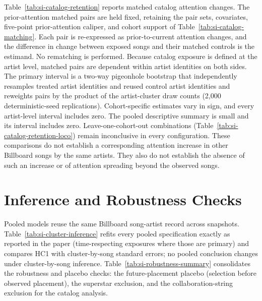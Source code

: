\documentclass[11pt]{article}
\begin{document}






Table~\ref{tab:si-catalog-retention} reports matched catalog attention changes. The prior-attention matched pairs are held fixed, retaining the pair sets, covariates, five-point prior-attention caliper, and cohort support of Table~\ref{tab:si-catalog-matching}. Each pair is re-expressed as prior-to-current attention changes, and the difference in change between exposed songs and their matched controls is the estimand. No rematching is performed. Because catalog exposure is defined at the artist level, matched pairs are dependent within artist identities on both sides. The primary interval is a two-way pigeonhole bootstrap that independently resamples treated artist identities and reused control artist identities and reweights pairs by the product of the artist-cluster draw counts (2,000 deterministic-seed replications). Cohort-specific estimates vary in sign, and every artist-level interval includes zero. The pooled descriptive summary is small and its interval includes zero. Leave-one-cohort-out combinations (Table~\ref{tab:si-catalog-retention-loco}) remain inconclusive in every configuration. These comparisons do not establish a corresponding attention increase in other Billboard songs by the same artists. They also do not establish the absence of such an increase or of attention spreading beyond the observed songs.





\section*{Inference and Robustness Checks}

Pooled models reuse the same Billboard song-artist record across snapshots. Table~\ref{tab:si-cluster-inference} refits every pooled specification exactly as reported in the paper (time-respecting exposures where those are primary) and compares HC1 with cluster-by-song standard errors; no pooled conclusion changes under cluster-by-song inference. Table~\ref{tab:si-robustness-summary} consolidates the robustness and placebo checks: the future-placement placebo (selection before observed placement), the superstar exclusion, and the collaboration-string exclusion for the catalog analysis.




\end{document}
